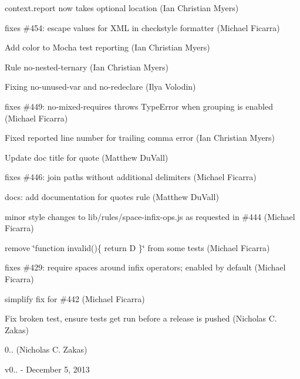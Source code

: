 \begin{DoxyItemize}
\item context.\+report now takes optional location (Ian Christian Myers)
\item fixes \#454\+: escape values for X\+ML in checkstyle formatter (Michael Ficarra)
\item Add color to Mocha test reporting (Ian Christian Myers)
\item Rule no-\/nested-\/ternary (Ian Christian Myers)
\item Fixing no-\/unused-\/var and no-\/redeclare (Ilya Volodin)
\item fixes \#449\+: no-\/mixed-\/requires throws Type\+Error when grouping is enabled (Michael Ficarra)
\item Fixed reported line number for trailing comma error (Ian Christian Myers)
\item Update doc title for quote (Matthew Du\+Vall)
\item fixes \#446\+: join paths without additional delimiters (Michael Ficarra)
\item docs\+: add documentation for quotes rule (Matthew Du\+Vall)
\item minor style changes to lib/rules/space-\/infix-\/ops.\+js as requested in \#444 (Michael Ficarra)
\item remove \char`\"{}function invalid()\{ return D \}\char`\"{} from some tests (Michael Ficarra)
\item fixes \#429\+: require spaces around infix operators; enabled by default (Michael Ficarra)
\item simplify fix for \#442 (Michael Ficarra)
\item Fix broken test, ensure tests get run before a release is pushed (Nicholas C. Zakas)
\item 0.. (Nicholas C. Zakas)
\end{DoxyItemize}

v0.. -\/ December 5, 2013


